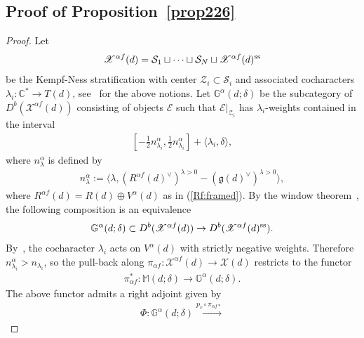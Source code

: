 \documentclass [11pt,oneside,a4paper,mathscr]{amsart}
\theoremstyle{definition}
\newcommand{\X}{\mathscr{X}}
\begin{document}
\subsection{Proof of Proposition~\ref{prop226}}\label{subsec:sod2}
\begin{proof}
    Let 
    \begin{align*}
        \X^{\alpha f}(d)=\mathcal{S}_1 \sqcup \cdots \sqcup \mathcal{S}_N \sqcup 
        \X^{\alpha f}(d)^{\rm{ss}}
    \end{align*}
    be the Kempf-Ness stratification with center $\mathcal{Z}_i \subset \mathcal{S}_i$
    and associated cocharacters $\lambda_i \colon \mathbb{C}^{\ast} \to T(d)$, 
    see~\cite[Section~2]{halp} for the above notions. 
    Let $\mathbb{G}^{\alpha}(d; \delta)$
    be the subcategory of $D^b(\X^{\alpha f}(d))$ consisting 
    of objects $\mathcal{E}$ such that $\mathcal{E}|_{\mathcal{Z}_i}$ has 
    $\lambda_i$-weights contained in the interval 
    \begin{align*}
        \left[-\frac{1}{2}n_{\lambda_i}^{\alpha}, \frac{1}{2}n_{\lambda_i}^{\alpha} \right]
        +\langle \lambda_i, \delta \rangle,
    \end{align*}
    where $n_{\lambda}^{\alpha}$ is defined by 
    \begin{align*}
        n_{\lambda}^{\alpha}:=\langle \lambda, (R^{\alpha f}(d)^{\vee})^{\lambda>0}
        -(\mathfrak{g}(d)^{\vee})^{\lambda>0} \rangle, 
    \end{align*} where $R^{\alpha f}(d)=R(d) \oplus V^{\alpha}(d)$ as in (\ref{Rf:framed}). 
    By the window theorem~\cite{halp, MR3895631}, the following 
    composition is an equivalence 
    \begin{align*}
        \mathbb{G}^{\alpha}(d; \delta) \subset D^b(\X^{\alpha f}(d)) \to D^b(\X^{\alpha f}(d)^{\rm{ss}}). 
    \end{align*}
    By~\cite[Lemma~5.1.9]{T}, the cocharacter $\lambda_i$ acts on 
    $V^{\alpha}(d)$ with strictly negative weights. 
    Therefore $n_{\lambda_i}^{\alpha}>n_{\lambda_i}$, so the pull-back 
    along $\pi_{\alpha f} \colon \X^{\alpha f}(d) \to \X(d)$ 
    restricts to the functor 
    \begin{align*}
    \pi_{\alpha f}^{\ast} \colon \mathbb{M}(d; \delta) \to \mathbb{G}^{\alpha}(d; \delta). 
    \end{align*}
    The above functor admits a right adjoint given by 
    \begin{align*}
    \Phi \colon 
        \mathbb{G}^{\alpha}(d; \delta)
        \xrightarrow{p_v \circ \pi_{\alpha f\ast}}

\end{align*}
\end{proof}
\end{document}
